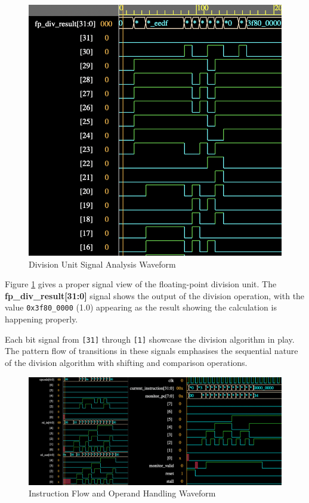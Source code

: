 \begin{figure}[htbp]
    \centering
    \includegraphics[width=\textwidth]{figures/waveform2.png}
    \caption{Division Unit Signal Analysis Waveform}
    \label{fig:waveform2}
\end{figure}

Figure \ref{fig:waveform2} gives a proper signal view of the floating-point division unit. The \textbf{fp\_div\_result[31:0]} signal shows the output of the division operation, with the value \texttt{0x3f80\_0000} (1.0) appearing as the result showing the calculation is happening properly.

Each bit signal from \texttt{[31]} through \texttt{[1]} showcase the division algorithm in play. The pattern flow of transitions in these signals emphasises the sequential nature of the division algorithm with shifting and comparison operations.

\begin{figure}[htbp]
    \centering
    \includegraphics[width=\textwidth]{figures/waveform3.png}
    \caption{Instruction Flow and Operand Handling Waveform}
    \label{fig:waveform3}
\end{figure}

